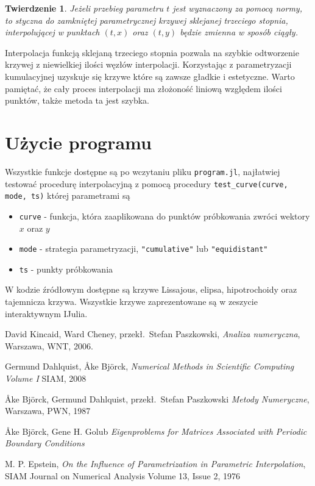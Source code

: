 \documentclass[11pt,wide]{mwart}
\newtheorem{tw}{Twierdzenie}
\begin{document}
\begin{tw}
	Jeżeli przebieg parametru $ t $ jest wyznaczony za pomocą normy, to styczna do zamkniętej parametrycznej krzywej sklejanej trzeciego stopnia, interpolującej w punktach $ (t, x) $ oraz $ (t, y) $ będzie zmienna w sposób ciągły. 
\end{tw} 

Interpolacja funkcją sklejaną trzeciego stopnia pozwala na szybkie odtworzenie krzywej z niewielkiej ilości węzłów interpolacji. Korzystając z parametryzacji kumulacyjnej uzyskuje się krzywe które są zawsze gładkie i estetyczne. Warto pamiętać, że cały proces interpolacji ma złożoność liniową względem ilości punktów, także metoda ta jest szybka.

\section{Użycie programu}

Wszystkie funkcje dostępne są po wczytaniu pliku \texttt{program.jl}, najłatwiej testować procedurę interpolacyjną z pomocą procedury \texttt{test\_curve(curve, mode, ts)} której parametrami są
\begin{itemize}
\item \texttt{curve} - funkcja, która zaaplikowana do punktów próbkowania zwróci wektory $ x $ oraz $ y $
\item \texttt{mode} - strategia parametryzacji, \texttt{"cumulative"} lub \texttt{"equidistant"}
\item \texttt{ts} - punkty próbkowania
\end{itemize}
W kodzie źródłowym dostępne są krzywe Lissajous, elipsa, hipotrochoidy oraz tajemnicza krzywa. Wszystkie krzywe zaprezentowane są w zeszycie interaktywnym IJulia.

\begin{thebibliography}{99}

 David Kincaid, Ward Cheney, przekł.~Stefan Paszkowski,
\emph{Analiza numeryczna},
Warszawa, WNT, 2006.

 Germund Dahlquist, \r{A}ke Bj\"{o}rck,
\emph{Numerical Methods in Scientific Computing Volume I}
SIAM, 2008

 \r{A}ke Bj\"{o}rck, Germund Dahlquist, przekł.~Stefan Paszkowski
\emph{Metody Numeryczne},
Warszawa, PWN, 1987

 \r{A}ke Bj\"{o}rck, Gene H. Golub
\emph{Eigenproblems for Matrices Associated with Periodic Boundary Conditions}

 M. P. Epstein, 
\emph{On the Influence of Parametrization in Parametric Interpolation},
SIAM Journal on Numerical Analysis Volume 13, Issue 2, 1976


\end{thebibliography}
\end{document}
